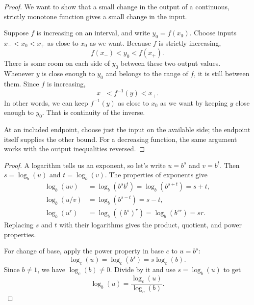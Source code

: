 \label{sec:inverse-continuity-proof}

\begin{proof}
We want to show that a small change in the output of a continuous,
strictly monotone function gives a small change in the input.

Suppose $f$ is increasing on an interval, and write $y_0=f(x_0)$.
Choose inputs $x_-<x_0<x_+$ as close to $x_0$ as we want. Because $f$
is strictly increasing,
$$f(x_-)<y_0<f(x_+).$$
There is some room on each side of $y_0$ between these two output values.
Whenever $y$ is close enough to $y_0$ and belongs to the range of $f$,
it is still between them. Since $f$ is increasing,
$$x_-<f^{-1}(y)<x_+.$$
In other words, we can keep $f^{-1}(y)$ as close to $x_0$ as we want
by keeping $y$ close enough to $y_0$. That is continuity of the inverse.

At an included endpoint, choose just the input on the available side;
the endpoint itself supplies the other bound. For a decreasing function,
the same argument works with the output inequalities reversed.
\end{proof}



\begin{proof}
A logarithm tells us an exponent, so let's write $u=b^s$ and $v=b^t$.
Then $s=\log_b(u)$ and $t=\log_b(v)$. The properties of exponents give
\begin{align*}
\log_b(uv)&=\log_b(b^sb^t)=\log_b(b^{s+t})=s+t,\\
\log_b(u/v)&=\log_b(b^{s-t})=s-t,\\
\log_b(u^r)&=\log_b((b^s)^r)=\log_b(b^{sr})=sr.
\end{align*}
Replacing $s$ and $t$ with their logarithms gives the product,
quotient, and power properties.

For change of base, apply the power property in base $c$ to $u=b^s$:
$$\log_c(u)=\log_c(b^s)=s\log_c(b).$$
Since $b\ne1$, we have $\log_c(b)\ne0$. Divide by it and use
$s=\log_b(u)$ to get
$$\log_b(u)=\frac{\log_c(u)}{\log_c(b)}.$$
\end{proof}


